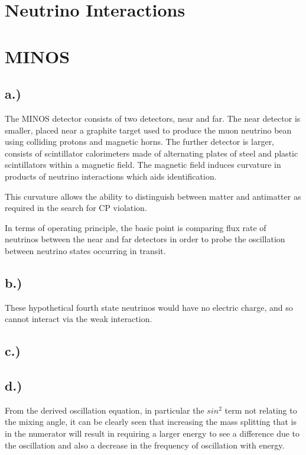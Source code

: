 \documentclass[]{article}
\begin{document}
\section{Neutrino Interactions}
\newpage
		
\section{MINOS}

	\subsection{a.) }
	
		The MINOS detector consists of two detectors, near and far. The near detector is smaller, placed near a graphite target used to produce the muon neutrino bean using colliding protons and magnetic horns. The further detector is larger, consists of scintillator calorimeters made of alternating plates of steel and plastic scintillators within a magnetic field. The magnetic field induces curvature in products of neutrino interactions which aids identification.
		
		This curvature allows the ability to  distinguish between matter and antimatter as required in the search for CP violation.
		
		In terms of operating principle, the basic point is comparing flux rate of neutrinos between the near and far detectors in order to probe the oscillation between neutrino states occurring in transit.
		
	\subsection{b.) }
	
		These hypothetical fourth state neutrinos would have no electric charge, and so cannot interact via the weak interaction.
		
	\subsection{c.) }
	\newpage
	
	\subsection{d.) }
	
	From the derived oscillation equation, in particular the $sin^2$ term not relating to the mixing angle, it can be clearly seen that increasing the mass splitting that is in the numerator will result in requiring a larger energy to see a difference due to the oscillation and also a decrease in the frequency of oscillation with energy.
\end{document}
